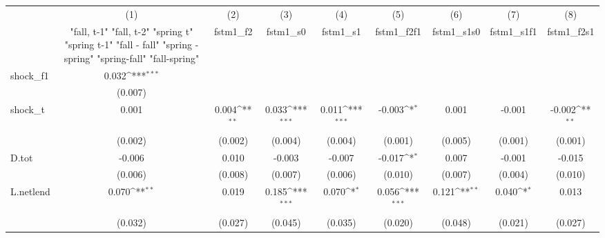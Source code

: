 {
\def\sym#1{\ifmmode^{#1}\else\(^{#1}\)\fi}
\begin{tabular}{l*{8}{c}}
\toprule
            &\multicolumn{1}{c}{(1)}&\multicolumn{1}{c}{(2)}&\multicolumn{1}{c}{(3)}&\multicolumn{1}{c}{(4)}&\multicolumn{1}{c}{(5)}&\multicolumn{1}{c}{(6)}&\multicolumn{1}{c}{(7)}&\multicolumn{1}{c}{(8)}\\
            &\multicolumn{1}{c}{  "fall, t-1" "fall, t-2" "spring t" "spring t-1"  "fall - fall" "spring - spring" "spring-fall" "fall-spring" }&\multicolumn{1}{c}{fstm1\_f2}&\multicolumn{1}{c}{fstm1\_s0}&\multicolumn{1}{c}{fstm1\_s1}&\multicolumn{1}{c}{fstm1\_f2f1}&\multicolumn{1}{c}{fstm1\_s1s0}&\multicolumn{1}{c}{fstm1\_s1f1}&\multicolumn{1}{c}{fstm1\_f2s1}\\
\midrule
shock\_f1    &       0.032\sym{***}&                     &                     &                     &                     &                     &                     &                     \\
            &     (0.007)         &                     &                     &                     &                     &                     &                     &                     \\
\addlinespace
shock\_t     &       0.001         &       0.004\sym{**} &       0.033\sym{***}&       0.011\sym{***}&      -0.003\sym{*}  &       0.001         &      -0.001         &      -0.002\sym{**} \\
            &     (0.002)         &     (0.002)         &     (0.004)         &     (0.004)         &     (0.001)         &     (0.005)         &     (0.001)         &     (0.001)         \\
\addlinespace
D.tot       &      -0.006         &       0.010         &      -0.003         &      -0.007         &      -0.017\sym{*}  &       0.007         &      -0.001         &      -0.015         \\
            &     (0.006)         &     (0.008)         &     (0.007)         &     (0.006)         &     (0.010)         &     (0.007)         &     (0.004)         &     (0.010)         \\
\addlinespace
L.netlend   &       0.070\sym{**} &       0.019         &       0.185\sym{***}&       0.070\sym{*}  &       0.056\sym{***}&       0.121\sym{**} &       0.040\sym{*}  &       0.013         \\
            &     (0.032)         &     (0.027)         &     (0.045)         &     (0.035)         &     (0.020)         &     (0.048)         &     (0.021)         &     (0.027)         \\

\end{tabular}}
